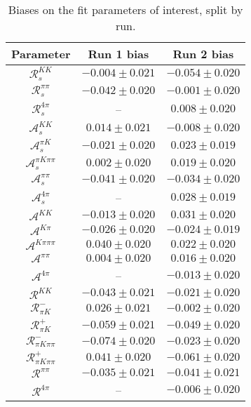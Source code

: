 \begin{table}
  \centering
  \small
  \begin{tabular}{ccc}
  \toprule
      Parameter & Run 1 bias & Run 2 bias \\
  \midrule
$\mathcal{R}_{s}^{KK}$ & $-0.004 \pm 0.021$ & $-0.054 \pm 0.020$ \\
$\mathcal{R}_{s}^{\pi\pi}$ & $-0.042 \pm 0.020$ & $-0.001 \pm 0.020$ \\
$\mathcal{R}_{s}^{4\pi}$ & -- & $0.008 \pm 0.020$ \\
$\mathcal{A}_s^{KK}$ & $0.014 \pm 0.021$ & $-0.008 \pm 0.020$ \\
$\mathcal{A}_s^{\pi K}$ & $-0.021 \pm 0.020$ & $0.023 \pm 0.019$ \\
$\mathcal{A}_s^{\pi K\pi\pi}$ & $0.002 \pm 0.020$ & $0.019 \pm 0.020$ \\
$\mathcal{A}_s^{\pi\pi}$ & $-0.041 \pm 0.020$ & $-0.034 \pm 0.020$ \\
$\mathcal{A}_s^{4\pi}$ & -- & $0.028 \pm 0.019$ \\
$\mathcal{A}^{KK}$ & $-0.013 \pm 0.020$ & $0.031 \pm 0.020$ \\
$\mathcal{A}^{K\pi}$ & $-0.026 \pm 0.020$ & $-0.024 \pm 0.019$ \\
$\mathcal{A}^{K\pi\pi\pi}$ & $0.040 \pm 0.020$ & $0.022 \pm 0.020$ \\
$\mathcal{A}^{\pi\pi}$ & $0.004 \pm 0.020$ & $0.016 \pm 0.020$ \\
$\mathcal{A}^{4\pi}$ & -- & $-0.013 \pm 0.020$ \\
$\mathcal{R}^{KK}$ & $-0.043 \pm 0.021$ & $-0.021 \pm 0.020$ \\
$\mathcal{R}_{\pi K}^-$ & $0.026 \pm 0.021$ & $-0.002 \pm 0.020$ \\
$\mathcal{R}_{\pi K}^+$ & $-0.059 \pm 0.021$ & $-0.049 \pm 0.020$ \\
$\mathcal{R}_{\pi K\pi\pi}^-$ & $-0.074 \pm 0.020$ & $-0.023 \pm 0.020$ \\
$\mathcal{R}_{\pi K\pi\pi}^+$ & $0.041 \pm 0.020$ & $-0.061 \pm 0.020$ \\
$\mathcal{R}^{\pi\pi}$ & $-0.035 \pm 0.021$ & $-0.041 \pm 0.021$ \\
$\mathcal{R}^{4\pi}$ & -- & $-0.006 \pm 0.020$ \\
      \bottomrule
  \end{tabular}
  \caption{Biases on the fit parameters of interest, split by run.}
\label{tab:biases_splitObs}
\end{table}
